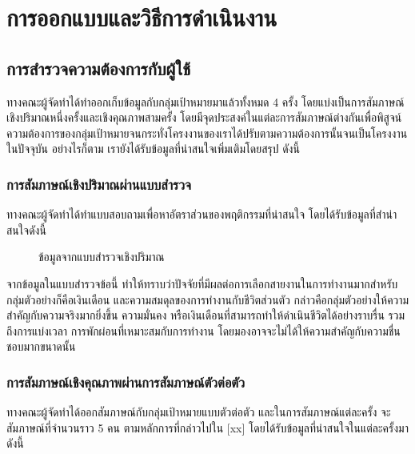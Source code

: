 \chapter{การออกแบบและวิธีการดำเนินงาน}

\section{การสำรวจความต้องการกับผู้ใช้}
ทางคณะผู้จัดทำได้ทำออกเก็บข้อมูลกับกลุ่มเป้าหมายมาแล้วทั้งหมด 4 ครั้ง โดยแบ่งเป็นการสัมภาษณ์เชิงปริมาณหนึ่งครั้งและเชิงคุณภาพสามครั้ง  โดยมีจุดประสงค์ในแต่ละการสัมภาษณ์ต่างกันเพื่อพิสูจน์ความต้องการของกลุ่มเป้าหมายจนกระทั่งโครงงานของเราได้ปรับตามความต้องการนั้นจนเป็นโครงงานในปัจจุบัน อย่างไรก็ตาม เรายังได้รับข้อมูลที่น่าสนใจเพิ่มเติมโดยสรุป ดังนี้

\subsection{การสัมภาษณ์เชิงปริมาณผ่านแบบสำรวจ}
ทางคณะผู้จัดทำได้ทำแบบสอบถามเพื่อหาอัตราส่วนของพฤติกรรมที่น่าสนใจ โดยได้รับข้อมูลที่สำน่าสนใจดังนี้
\begin{figure}[!h]\centering
    \setlength{\fboxrule}{0.2mm} %
    \setlength{\fboxsep}{0.5cm}
    \caption{ข้อมูลจากแบบสำรวจเชิงปริมาณ}\label{fig:model4}
\end{figure}
จากข้อมูลในแบบสำรวจข้อนี้ ทำให้ทราบว่าปัจจัยที่มีผลต่อการเลือกสายงานในการทำงานมากสำหรับกลุ่มตัวอย่างก็คือเงินเดือน และความสมดุลของการทำงานกับชีวิตส่วนตัว กล่าวคือกลุ่มตัวอย่างให้ความสำคัญกับความจริงมากยิ่งขึ้น ความมั่นคง หรือเงินเดือนที่สามารถทำให้ดำเนินชีวิตได้อย่างราบรื่น รวมถึงการแบ่งเวลา การพักผ่อนที่เหมาะสมกับการทำงาน โดยมองอาจจะไม่ได้ให้ความสำคัญกับความชื่นชอบมากขนาดนั้น

\subsection{การสัมภาษณ์เชิงคุณภาพผ่านการสัมภาษณ์ตัวต่อตัว}
ทางคณะผู้จัดทำได้ออกสัมภาษณ์กับกลุ่มเป้าหมายแบบตัวต่อตัว และในการสัมภาษณ์แต่ละครั้ง จะสัมภาษณ์ที่จำนวนราว 5 คน ตามหลักการที่กล่าวไปใน [xx] โดยได้รับข้อมูลที่น่าสนใจในแต่ละครั้งมาดังนี้

